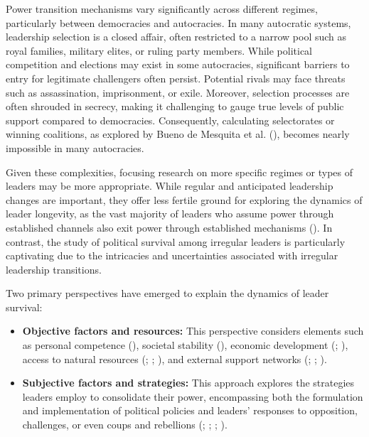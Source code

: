 \documentclass[
  12pt,
]{report}
\begin{document}
Power transition mechanisms vary significantly across different regimes,
particularly between democracies and autocracies. In many autocratic
systems, leadership selection is a closed affair, often restricted to a
narrow pool such as royal families, military elites, or ruling party
members. While political competition and elections may exist in some
autocracies, significant barriers to entry for legitimate challengers
often persist. Potential rivals may face threats such as assassination,
imprisonment, or exile. Moreover, selection processes are often shrouded
in secrecy, making it challenging to gauge true levels of public support
compared to democracies. Consequently, calculating selectorates or
winning coalitions, as explored by Bueno de Mesquita et al.
(), becomes nearly impossible in
many autocracies.

Given these complexities, focusing research on more specific regimes or
types of leaders may be more appropriate. While regular and anticipated
leadership changes are important, they offer less fertile ground for
exploring the dynamics of leader longevity, as the vast majority of
leaders who assume power through established channels also exit power
through established mechanisms (). In contrast, the study of political
survival among irregular leaders is particularly captivating due to the
intricacies and uncertainties associated with irregular leadership
transitions.

Two primary perspectives have emerged to explain the dynamics of leader
survival:

\begin{itemize}
\item
  \textbf{Objective factors and resources:} This perspective considers
  elements such as personal competence (), societal stability
  (), economic development
  (;
  ), access to natural
  resources (;
  ;
  ), and
  external support networks (;
  ; ).
\item
  \textbf{Subjective factors and strategies:} This approach explores the
  strategies leaders employ to consolidate their power, encompassing
  both the formulation and implementation of political policies and
  leaders' responses to opposition, challenges, or even coups and
  rebellions (;
  ;
  ;
  ).
\end{itemize}
\end{document}
